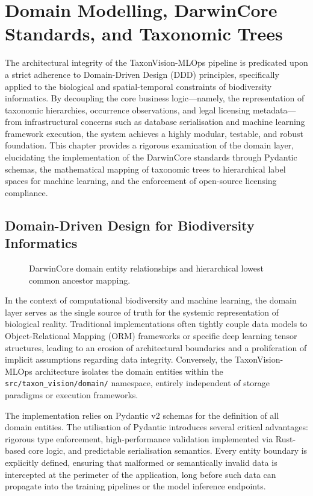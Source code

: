 \chapter{Domain Modelling, DarwinCore Standards, and Taxonomic Trees}
\label{ch:domain_modelling}

The architectural integrity of the TaxonVision-MLOps pipeline is predicated upon a strict adherence to Domain-Driven Design (DDD) principles, specifically applied to the biological and spatial-temporal constraints of biodiversity informatics. By decoupling the core business logic—namely, the representation of taxonomic hierarchies, occurrence observations, and legal licensing metadata—from infrastructural concerns such as database serialisation and machine learning framework execution, the system achieves a highly modular, testable, and robust foundation. This chapter provides a rigorous examination of the domain layer, elucidating the implementation of the DarwinCore standards through Pydantic schemas, the mathematical mapping of taxonomic trees to hierarchical label spaces for machine learning, and the enforcement of open-source licensing compliance.

\section{Domain-Driven Design for Biodiversity Informatics}
\label{sec:ddd_biodiversity}

\begin{figure}[htbp]
\centering

\caption{DarwinCore domain entity relationships and hierarchical lowest common ancestor mapping.}
\label{fig:darwincore_taxonomic_hierarchy}
\end{figure}

In the context of computational biodiversity and machine learning, the domain layer serves as the single source of truth for the systemic representation of biological reality. Traditional implementations often tightly couple data models to Object-Relational Mapping (ORM) frameworks or specific deep learning tensor structures, leading to an erosion of architectural boundaries and a proliferation of implicit assumptions regarding data integrity. Conversely, the TaxonVision-MLOps architecture isolates the domain entities within the \texttt{src/taxon\_vision/domain/} namespace, entirely independent of storage paradigms or execution frameworks.

The implementation relies on Pydantic v2 schemas for the definition of all domain entities. The utilisation of Pydantic introduces several critical advantages: rigorous type enforcement, high-performance validation implemented via Rust-based core logic, and predictable serialisation semantics. Every entity boundary is explicitly defined, ensuring that malformed or semantically invalid data is intercepted at the perimeter of the application, long before such data can propagate into the training pipelines or the model inference endpoints.

